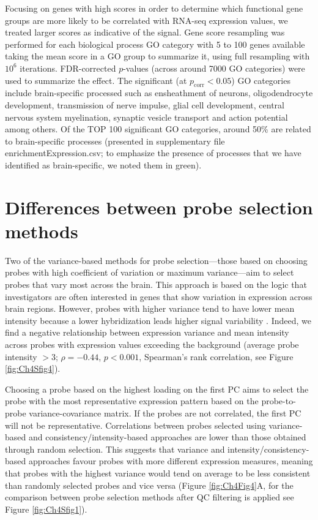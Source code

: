 Focusing on genes with high scores in order to determine which functional gene groups are more likely to be correlated with RNA-seq expression values, we treated larger scores as indicative of the signal. Gene score resampling was performed for each biological process GO category with 5 to 100 genes available taking the mean score in a GO group to summarize it, using full resampling with $10^{6}$ iterations. FDR-corrected $p$-values (across around \num{7000} GO categories) were used to summarize the effect. The significant (at $p_\mathrm{corr}<0.05$) GO categories include brain-specific processed such as ensheathment of neurons, oligodendrocyte development, transmission of nerve impulse, glial cell development, central nervous system myelination, synaptic vesicle transport and action potential among others. Of the TOP 100 significant GO categories, around 50\% are related to brain-specific processes (presented in supplementary file enrichmentExpression.csv; to emphasize the presence of processes that we have identified as brain-specific, we noted them in green).


\section{Differences between probe selection methods}
\label{app:AppendixCh4_3}

Two of the variance-based methods for probe selection—those based on choosing probes with high coefficient of variation or maximum variance—aim to select probes that vary most across the brain. This approach is based on the logic that investigators are often interested in genes that show variation in expression across brain regions. However, probes with higher variance tend to have lower mean intensity because a lower hybridization leads higher signal variability \citep{Quackenbush2002a}. Indeed, we find a negative relationship between expression variance and mean intensity across probes with expression values exceeding the background (average probe intensity $> 3$; $\rho = -0.44$, $p < 0.001$, Spearman's rank correlation, see Figure \ref{fig:Ch4Sfig4}).

Choosing a probe based on the highest loading on the first PC aims to select the probe with the most representative expression pattern based on the probe-to-probe variance-covariance matrix. If the probes are not correlated, the first PC will not be representative. Correlations between probes selected using variance-based and consistency/intensity-based approaches are lower than those obtained through random selection. This suggests that variance and intensity/consistency-based approaches favour probes with more different expression measures, meaning that probes with the highest variance would tend on average to be less consistent than randomly selected probes and vice versa (Figure \ref{fig:Ch4Fig4}A, for the comparison between probe selection methods after QC filtering is applied see Figure \ref{fig:Ch4Sfig1}).

